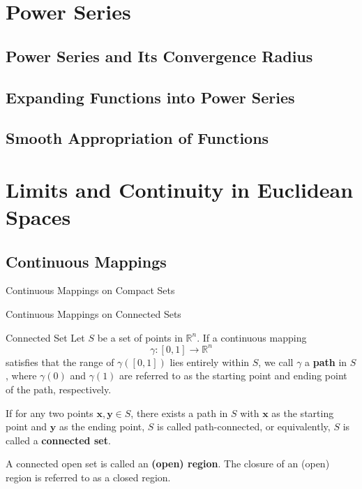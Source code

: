 \documentclass[11pt]{../../TexTemplate/elegantbook}
\begin{document}
\chapter{Power Series}
\section{Power Series and Its Convergence Radius}

\section{Expanding Functions into Power Series}

\section{Smooth Appropriation of Functions}

\chapter{Limits and Continuity in Euclidean Spaces}

\section{Continuous Mappings}
\begin{leftbarTitle}{Continuous Mappings on Compact Sets}\end{leftbarTitle}

\begin{leftbarTitle}{Continuous Mappings on Connected Sets}\end{leftbarTitle}
\begin{definition}{Connected Set}
    Let \(S\) be a set of points in \(\mathbb{R}^n\). 
    If a continuous mapping 
    \[
        \gamma: [0, 1] \to \mathbb{R}^n
    \]
    satisfies that the range of \(\gamma([0, 1])\) lies entirely within \(S\), 
    we call \(\gamma\) a \textbf{path} in \(S\), 
    where \(\gamma(0)\) and \(\gamma(1)\) are referred to as the starting point and ending point of the path, respectively.  
    
    If for any two points \(\mathbf{x}, \mathbf{y} \in S\), 
    there exists a path in \(S\) with \(\mathbf{x}\) as the starting point and \(\mathbf{y}\) as the ending point, 
    \(S\) is called path-connected, or equivalently, \(S\) is called a \textbf{connected set}.  
    
    A connected open set is called an \textbf{(open) region}. The closure of an (open) region is referred to as a closed region.
\end{definition}
\end{document}
